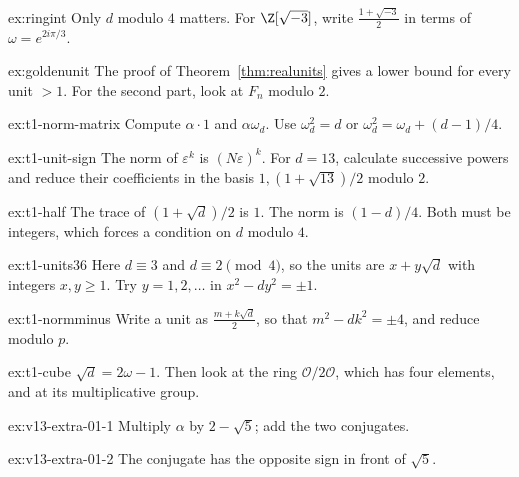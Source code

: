 \begin{hint}{ex:ringint}
Only $d$ modulo $4$ matters. For $\Z[\sqrt{-3}]$, write $\frac{1+\sqrt{-3}}2$ in terms of $\omega=e^{2i\pi/3}$.
\end{hint}

\begin{hint}{ex:goldenunit}
The proof of Theorem~\ref{thm:realunits} gives a lower bound for every unit $>1$. For the second part, look at $F_n$ modulo $2$.
\end{hint}

\begin{hint}{ex:t1-norm-matrix}
Compute $\alpha\cdot1$ and $\alpha\omega_d$. Use
$\omega_d^2=d$ or $\omega_d^2=\omega_d+(d-1)/4$.
\end{hint}

\begin{hint}{ex:t1-unit-sign}
The norm of $\varepsilon^k$ is $(N\varepsilon)^k$.
For $d=13$, calculate successive powers and reduce their coefficients
in the basis $1,(1+\sqrt{13})/2$ modulo $2$.
\end{hint}

\begin{hint}{ex:t1-half}
The trace of $(1+\sqrt d)/2$ is $1$. The norm is $(1-d)/4$. Both must be integers, which forces a condition on $d$ modulo $4$.
\end{hint}

\begin{hint}{ex:t1-units36}
Here $d\equiv3$ and $d\equiv2\pmod4$, so the units are $x+y\sqrt d$ with integers $x,y\ge1$. Try $y=1,2,\dots$ in $x^2-dy^2=\pm1$.
\end{hint}

\begin{hint}{ex:t1-normminus}
Write a unit as $\frac{m+k\sqrt d}2$, so that $m^2-dk^2=\pm4$, and reduce modulo $p$.
\end{hint}

\begin{hint}{ex:t1-cube}
$\sqrt d=2\omega-1$. Then look at the ring $\mathcal O/2\mathcal O$, which has four elements, and at its multiplicative group.
\end{hint}

\begin{hint}{ex:v13-extra-01-1}
Multiply $\alpha$ by $2-\sqrt5$; add the two conjugates.
\end{hint}

\begin{hint}{ex:v13-extra-01-2}
The conjugate has the opposite sign in front of $\sqrt5$.
\end{hint}

